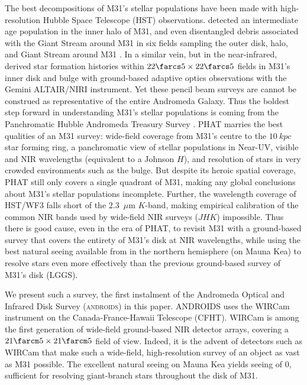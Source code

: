 \documentclass[iop]{emulateapj}
\newcommand{\androids}{\textsc{androids}}
\begin{document}
The best decompositions of M31's stellar populations have been made with high-resolution Hubble Space Telescope (HST) observations.
\cite{Brown:2003,Brown:2006,Brown:2008} detected an intermediate age population in the inner halo of M31, and even disentangled debris associated with the Giant Stream around M31 in six fields sampling the outer disk, halo, and Giant Stream around M31 \citep{Brown:2009a}.
In a similar vein, but in the near-infrared, \cite{Olsen:2006} derived star formation histories within $22\farcs5\times22\farcs5$ fields in M31's inner disk and bulge with ground-based adaptive optics observations with the Gemini ALTAIR/NIRI instrument.
Yet these pencil beam surveys are cannot be construed as representative of the entire Andromeda Galaxy.
Thus the boldest step forward in understanding M31's stellar populations is coming from the Panchromatic Hubble Andromeda Treasury Survey \citep[PHAT][]{Dalcanton:2012}.
PHAT marries the best qualities of an M31 survey: wide-field coverage from M31's centre to the $10~kpc$ star forming ring, a panchromatic view of stellar populations in Near-UV, visible and NIR wavelengths (equivalent to a Johnson $H$), and resolution of stars in very crowded environments such as the bulge.
But despite its heroic spatial coverage, PHAT still only covers a single quadrant of M31, making any global conclusions about M31's stellar populations incomplete.
Further, the wavelength coverage of HST/WF3 falls short of the $2.3$~$\mu$m $K$-band, making empirical calibration of the common NIR bands used by wide-field NIR surveys ($JHK$) impossible.
Thus there is good cause, even in the era of PHAT, to revisit M31 with a ground-based survey that covers the entirety of M31's disk at NIR wavelengths, while using the best natural seeing available from in the northern hemisphere (on Mauna Kea) to resolve stars even more effectively than the previous ground-based survey of M31's disk (LGGS).

We present such a survey, the first instalment of the Andromeda Optical and Infrared Disk Survey (\androids) in this paper.
ANDROIDS uses the WIRCam instrument \citep{Puget:2004} on the Canada-France-Hawaii Telescope (CFHT).
WIRCam is among the first generation of wide-field ground-based NIR detector arrays, covering a $21\farcm 5 \times 21\farcm 5$ field of view.
Indeed, it is the advent of detectors such as WIRCam that make such a wide-field, high-resolution survey of an object as vast as M31 possible.
The excellent natural seeing on Mauna Kea yields seeing of 0, sufficient for resolving giant-branch stars throughout the disk of M31.
\end{document}
